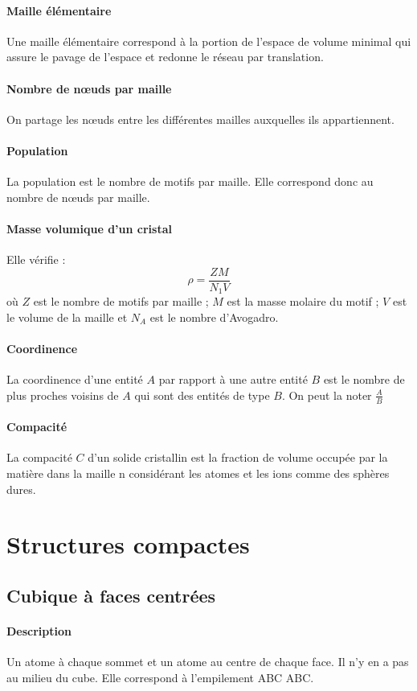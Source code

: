 \documentclass[french]{book}
\theoremstyle{plain}
\theoremstyle{definition}
\theoremstyle{remark}
\begin{document}
\paragraph{Maille élémentaire} Une maille élémentaire correspond à la portion de l'espace de volume minimal qui assure le pavage de l'espace et redonne le réseau par translation.
\paragraph{Nombre de nœuds par maille} On partage les nœuds entre les différentes mailles auxquelles ils appartiennent.
\paragraph{Population} La population est le nombre de motifs par maille. Elle correspond donc au nombre de nœuds par maille.
\paragraph{Masse volumique d'un cristal} Elle vérifie : $$\rho=\frac{ZM}{N_1V}$$ où $Z$ est le nombre de motifs par maille ; $M$ est la masse molaire du motif ; $V$ est le volume de la maille et $N_A$ est le nombre d'Avogadro.
\paragraph{Coordinence} La coordinence d'une entité $A$ par rapport à une autre entité $B$ est le nombre de plus proches voisins de $A$ qui sont des entités de type $B$. On peut la noter $\displaystyle\frac{A}{B}$
\paragraph{Compacité} La compacité $C$ d'un solide cristallin est la fraction de volume occupée par la matière dans la maille n considérant les atomes et les ions comme des sphères dures.
\section{Structures compactes}
\subsection{Cubique à faces centrées}
\paragraph{Description} Un atome à chaque sommet et un atome au centre de chaque face. Il n'y en a pas au milieu du cube. Elle correspond à l'empilement ABC ABC.
\end{document}
